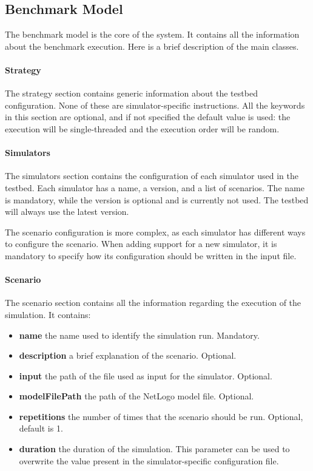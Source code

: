 \documentclass[12pt,a4paper,openright,twoside]{book}
\begin{document}
\subsection{Benchmark Model}

The benchmark model is the core of the system. It contains all the information about the benchmark execution.
Here is a brief description of the main classes.

\paragraph*{Strategy} The strategy section contains generic information about the testbed configuration. None of these 
are simulator-specific instructions.
All the keywords in this section are optional, and if not specified the default value is used: the execution will be
single-threaded and the execution order will be random.

\paragraph*{Simulators} The simulators section contains the configuration of each simulator used in the testbed.
Each simulator has a name, a version, and a list of scenarios. The name is mandatory, while the version is optional 
and is currently not used. The testbed will always use the latest version.

The scenario configuration is more complex, as each simulator has different ways to configure the scenario.
When adding support for a new simulator, it is mandatory to specify how its configuration should be written in the input file.

\paragraph*{Scenario}
The scenario section contains all the information regarding the execution of the simulation.
It contains:
\begin{itemize}
    \item \textbf{name} the name used to identify the simulation run. Mandatory.
    \item \textbf{description} a brief explanation of the scenario. Optional.
    \item \textbf{input} the path of the file used as input for the simulator. Optional.
    \item \textbf{modelFilePath} the path of the NetLogo model file. Optional.
    \item \textbf{repetitions} the number of times that the scenario should be run. Optional, default is 1.
    \item \textbf{duration} the duration of the simulation. This parameter can be used to overwrite the value present in the simulator-specific configuration file.
\end{itemize}
\end{document}
